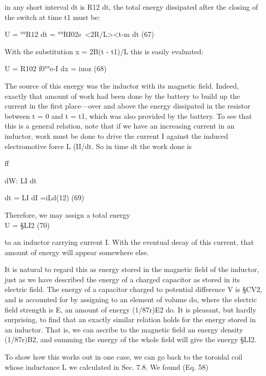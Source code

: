 in any short interval dt is R12 dt, the total energy dissipated after
the closing of the switch at time t1 must be:

\begin{equation}
\end{equation}
U = °°R12 dt = °°RI02e~<2R/L><t-m dt (67)

With the substitution x = 2B(t - t1)/L this is easily evaluated:

\begin{equation}
\end{equation}
U = R102 f0°°e-I dx = iuoz (68)

The source of this energy was the inductor with its magnetic field.
Indeed, exactly that amount of work had been done by the battery
to build up the current in the first place---over and above the energy
dissipated in the resistor between t = 0 and t = t1, which was also
provided by the battery. To see that this is a general relation, note
that if we have an increasing current in an inductor, work must be
done to drive the current I against the induced electromotive force
L (II/dt. So in time dt the work done is

ff

\begin{equation}
\end{equation}
dW: LI dt

dt = LI dI =iLd(12) (69)

Therefore, we may assign a total energy
\begin{equation}
\end{equation}
U = §LI2 (70)

to an inductor carrying current I. With the eventual decay of this
current, that amount of energy will appear somewhere else.

It is natural to regard this as energy stored in the magnetic field
of the inductor, just as we have described the energy of a charged
capacitor as stored in its electric field. The energy of a capacitor
charged to potential difference V is §CV2, and is accounted for by
assigning to an element of volume do, where the electric field strength
is E, an amount of energy (1/87r)E2 do. It is pleasant, but hardly
surprising, to find that an exactly similar relation holds for the energy
stored in an inductor. That is, we can ascribe to the magnetic field
an energy density (1/87r)B2, and summing the energy of the whole
field will give the energy §LI2.

To show how this works out in one case, we can go back to the
toroidal coil whose inductance L we calculated in Sec. 7.8. We
found (Eq. 58)

